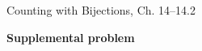 \documentclass[handout]{mcs}
\begin{document}

\begin{staffnotes}
Counting with Bijections, Ch. 14--14.2
\end{staffnotes}




\begin{center}
\textbf{\large Supplemental problem}
\end{center}


\end{document}
